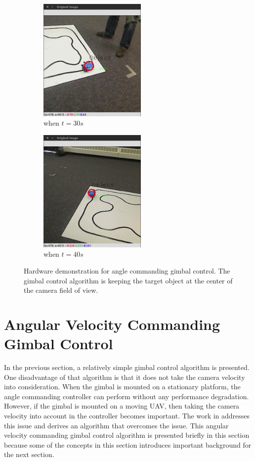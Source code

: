 \begin{figure}[htbp]
\begin{subfigure}{0.5\textwidth}
		\centering
		\includegraphics[height=6cm]{images/chapter2/gimbal_30s.png}
		\caption{when $t=30s$}
	\end{subfigure}
	\begin{subfigure}{0.5\textwidth}
		\centering
		\includegraphics[height=6cm]{images/chapter2/gimbal_40s.png}
		\caption{when $t=40s$}
	\end{subfigure}	
	\caption[Hardware demonstration for the angle commanding gimbal control.]{Hardware demonstration for angle commanding gimbal control. The gimbal control algorithm is keeping the target object at the center of the camera field of view.}
	\label{gimbal_result}
\end{figure}


\section{Angular Velocity Commanding Gimbal Control}
In the previous section, a relatively simple gimbal control algorithm is presented. One disadvantage of that algorithm is that it does not take the camera velocity into consideration. When the gimbal is mounted on a stationary platform, the angle commanding controller can perform without any performance degradation. However, if the gimbal is mounted on a moving UAV, then taking the camera velocity into account in the controller becomes important. The work in \cite{Hurak2012} addresses this issue and derives an algorithm that overcomes the issue. This angular velocity commanding gimbal control algorithm is presented briefly in this section because some of the concepts in this section introduces important background for the next section. 


